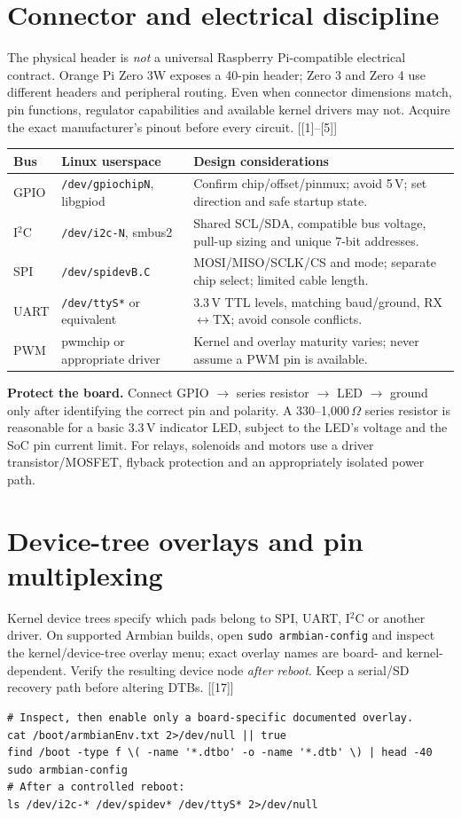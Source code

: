 \documentclass[10pt,oneside,openany]{report}
\newcommand{\code}[1]{\texttt{#1}}
\newcommand{\smallref}[1]{{\sffamily\scriptsize\color{slate}[#1]}}
\begin{document}
\section{Connector and electrical discipline}
The physical header is \emph{not} a universal Raspberry Pi-compatible electrical contract. Orange Pi Zero 3W exposes a 40-pin header; Zero 3 and Zero 4 use different headers and peripheral routing. Even when connector dimensions match, pin functions, regulator capabilities and available kernel drivers may not. Acquire the exact manufacturer's pinout before every circuit. \smallref{[1]--[5]}
\begin{center}\small\begin{tabularx}{\textwidth}{@{}p{1.2cm}p{3.1cm}X@{}}\toprule
\textbf{Bus} & \textbf{Linux userspace} & \textbf{Design considerations}\\\midrule
GPIO & \code{/dev/gpiochipN}, libgpiod & Confirm chip/offset/pinmux; avoid 5\,V; set direction and safe startup state.\\
I\(^{2}\)C & \code{/dev/i2c-N}, smbus2 & Shared SCL/SDA, compatible bus voltage, pull-up sizing and unique 7-bit addresses.\\
SPI & \code{/dev/spidevB.C} & MOSI/MISO/SCLK/CS and mode; separate chip select; limited cable length.\\
UART & \code{/dev/ttyS*} or equivalent & 3.3\,V TTL levels, matching baud/ground, RX\(\leftrightarrow\)TX; avoid console conflicts.\\
PWM & pwmchip or appropriate driver & Kernel and overlay maturity varies; never assume a PWM pin is available.\\\bottomrule\end{tabularx}\end{center}
\begin{cautionbox}
\textbf{Protect the board.} Connect GPIO \(\to\) series resistor \(\to\) LED \(\to\) ground only after identifying the correct pin and polarity. A 330--1,000\,\(\Omega\) series resistor is reasonable for a basic 3.3\,V indicator LED, subject to the LED's voltage and the SoC pin current limit. For relays, solenoids and motors use a driver transistor/MOSFET, flyback protection and an appropriately isolated power path.
\end{cautionbox}
\section{Device-tree overlays and pin multiplexing}
Kernel device trees specify which pads belong to SPI, UART, I\(^{2}\)C or another driver. On supported Armbian builds, open \code{sudo armbian-config} and inspect the kernel/device-tree overlay menu; exact overlay names are board- and kernel-dependent. Verify the resulting device node \emph{after reboot}. Keep a serial/SD recovery path before altering DTBs. \smallref{[17]}
\begin{lstlisting}[style=sh]
# Inspect, then enable only a board-specific documented overlay.
cat /boot/armbianEnv.txt 2>/dev/null || true
find /boot -type f \( -name '*.dtbo' -o -name '*.dtb' \) | head -40
sudo armbian-config
# After a controlled reboot:
ls /dev/i2c-* /dev/spidev* /dev/ttyS* 2>/dev/null
\end{lstlisting}
\end{document}

